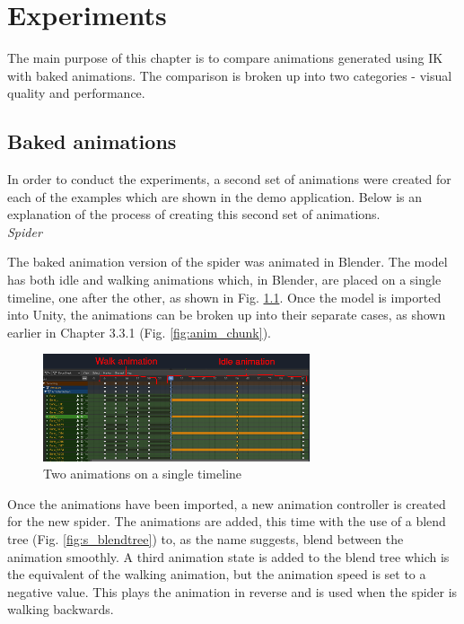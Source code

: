 \chapter{Experiments}
The main purpose of this chapter is to compare animations generated using IK
with baked animations. The comparison is broken up into two categories - visual
quality and performance. 

\section{Baked animations}
 In order to conduct the experiments, a second set of animations were created
 for each of the examples which are shown in the demo application. Below is an
 explanation of the process of creating this second set of animations. \\

\noindent\textit{Spider}

The baked animation version of the spider was animated in Blender. The model
has both idle and walking animations which, in Blender, are placed on
a single timeline, one after the other, as shown in Fig. \ref{fig:timeline}.
Once the model is imported into Unity, the animations can be broken up into
their separate cases, as shown earlier in Chapter 3.3.1 (Fig.
\ref{fig:anim_chunk}). 

\begin{figure}[h!]
    \centering
    \includegraphics[width=0.7\textwidth]{grafika/blender_timeline.eps}
    \caption{Two animations on a single timeline}
    \label{fig:timeline}
\end{figure}

Once the animations have been imported, a new animation controller is created
for the new spider. The animations are added, this time with the use of a blend
tree (Fig. \ref{fig:s_blendtree}) to, as the name suggests, blend between the
animation smoothly. A third animation state is added to the blend tree
which is the equivalent of the walking animation, but the animation speed is set
to a negative value. This plays the animation in reverse and is used when the
spider is walking backwards. 

